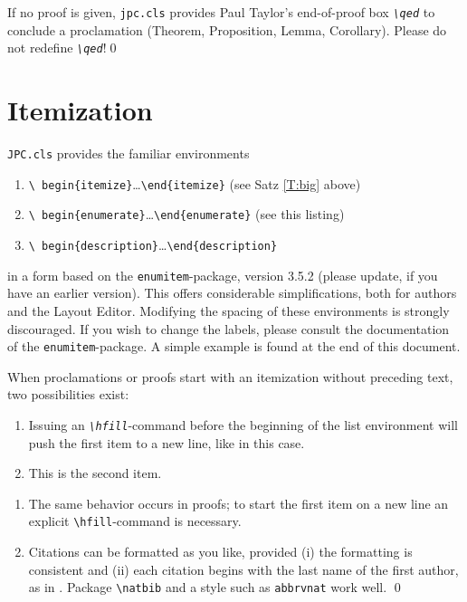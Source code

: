\documentclass{jpc} %
\theoremstyle{plain}\newtheorem{satz}[thm]{Satz} %
\begin{document}
\begin{cor}\label{C:big}
  If no proof is given, \texttt{jpc.cls} provides Paul Taylor's
  end-of-proof box \emph{\texttt{\textbackslash qed}} to conclude a
  proclamation (Theorem, Proposition, Lemma, Corollary).  Please do
  not redefine \emph{\texttt{\textbackslash qed}}!\qed
\end{cor}

\section{Itemization}\label{S:item}
  \texttt{JPC.cls} provides the familiar environments 
\begin{enumerate}
\item\texttt{\textbackslash
  begin\{itemize\}}\dots\texttt{\textbackslash end\{itemize\}} (see
 Satz \ref{T:big} above)
\item\texttt{\textbackslash
  begin\{enumerate\}}\dots\texttt{\textbackslash end\{enumerate\}}
  (see this listing)
\item\texttt{\textbackslash
    begin\{description\}}\dots\texttt{\textbackslash end\{description\}}
\end{enumerate}
  in a form based on the \texttt{enumitem}-package, version 3.5.2
  (please update, if you have an earlier version).  This offers
  considerable simplifications, both for authors and the Layout
  Editor.  Modifying the spacing of these environments is strongly
  discouraged.  If you wish to change the labels, please consult the
  documentation of the \texttt{enumitem}-package.  A simple example is
  found at the end of this document.

  When proclamations or proofs start with an itemization without
  preceding text, two possibilities exist:

\begin{thm}\label{T:m}\hfill  %
\begin{enumerate}
\item
  Issuing an {\em\texttt{\textbackslash hfill}}-command before the
  beginning of the list environment will push the first item to a new
  line, like in this case.
\item
  This is the second item.
\end{enumerate}
\end{thm}

\proof\hfill  %
\begin{enumerate}
\item
  The same behavior occurs in proofs; to start the first item on a
  new line an explicit \texttt{\textbackslash hfill}-command is necessary.
\item
  Citations can be formatted as you like, provided (i) the formatting is consistent and (ii) each citation begins with the last name of the first author, as in \cite{Abowd:Nissim:Skinner:2009}. Package \texttt{\textbackslash natbib} and a style such as \texttt{abbrvnat} work well. \qed
\end{enumerate}
\end{document}
